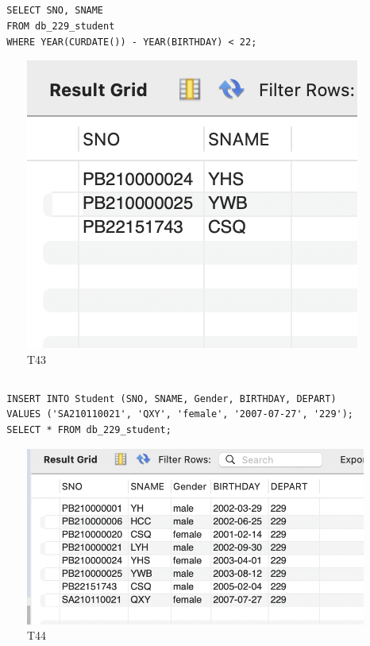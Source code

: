 \documentclass[UTF8]{ctexart}
\begin{document}
\subsection{}
\begin{lstlisting}
  SELECT SNO, SNAME
  FROM db_229_student
  WHERE YEAR(CURDATE()) - YEAR(BIRTHDAY) < 22;
\end{lstlisting}
\begin{figure}[H]
  \centering
  \includegraphics[scale=0.7]{pics/43.png}
  \caption*{T43}
\end{figure}

\subsection{}
\begin{lstlisting}
  INSERT INTO Student (SNO, SNAME, Gender, BIRTHDAY, DEPART)
  VALUES ('SA210110021', 'QXY', 'female', '2007-07-27', '229');
  SELECT * FROM db_229_student;
\end{lstlisting}
\begin{figure}[H]
  \centering
  \includegraphics[scale=0.7]{pics/44.png}
  \caption*{T44}
\end{figure}
\end{document}
